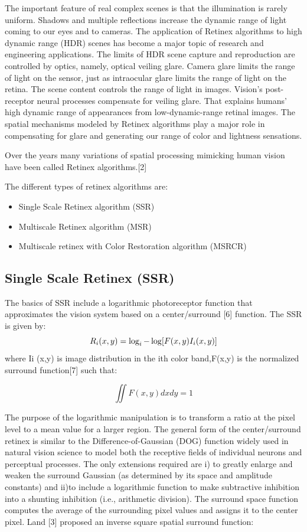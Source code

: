 The important feature of real complex scenes is that the illumination is rarely uniform. Shadows and multiple reflections increase the dynamic range of light coming to our eyes and to cameras. The application of Retinex algorithms to high dynamic range (HDR) scenes has become a major topic of research and engineering applications. The limits of HDR scene capture and reproduction are controlled by optics, namely, optical veiling glare. Camera glare limits the range of light on the sensor, just as intraocular glare limits the range of light on the retina. The scene content controls the range of light in images. Vision’s post-receptor neural processes compensate for veiling glare. That explains humans’ high dynamic range of appearances from low-dynamic-range retinal images. The spatial mechanisms modeled by Retinex algorithms play a major role in compensating for glare and generating our range of color and lightness sensations.

Over the years many variations of spatial processing mimicking human vision have been called Retinex algorithms.[2]

The different types of retinex algorithms are: 
\begin{itemize}
		\item Single Scale Retinex algorithm (SSR)
		\item Multiscale Retinex algorithm (MSR)
		\item Multiscale retinex with Color Restoration algorithm (MSRCR) 
\end{itemize}
	
\subsection{Single Scale Retinex (SSR)}
The basics of SSR include a logarithmic photoreceptor function that approximates the vision system based on a center/surround [6] function. The SSR is given by:
\begin{equation}
	R_{i}(x,y)=\log_{i}-\log[F(x,y)\*I_{i}(x,y)]
\end{equation}
where Ii (x,y) is image distribution in the ith color band,F(x,y) is the normalized surround function[7] such that:

\begin{equation}
	\iint F(x,y)dxdy=1
\end{equation}

The purpose of the logarithmic manipulation is to transform a ratio at the pixel level to a mean value for a
larger region. The general form of the center/surround retinex is similar to the Difference-of-Gaussian (DOG)
function widely used in natural vision science to model both the receptive fields of individual neurons and
perceptual processes. The only extensions required are i) to greatly enlarge and weaken the surround Gaussian (as
determined by its space and amplitude constants) and ii)to include a logarithmic function to make subtractive
inhibition into a shunting inhibition (i.e., arithmetic division). The surround space function computes the
average of the surrounding pixel values and assigns it to the center pixel.
Land [3] proposed an inverse square spatial surround function:

